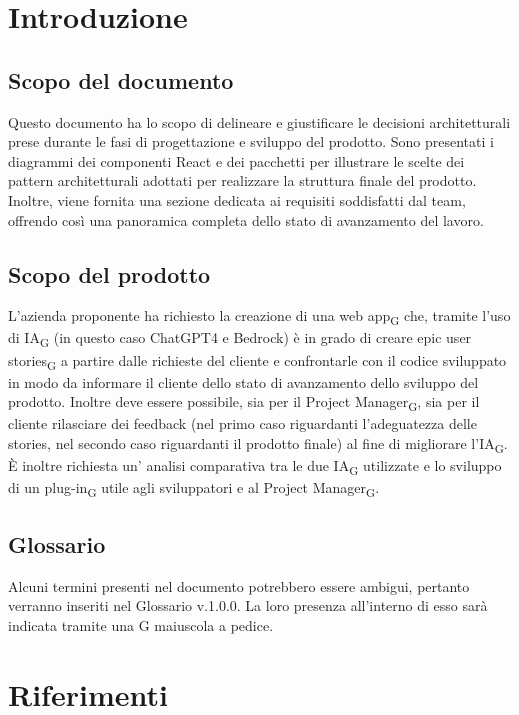 \documentclass{article}
\begin{document}
{\section{Introduzione}
\subsection{Scopo del documento}
Questo documento ha lo scopo di delineare e giustificare le decisioni architetturali prese durante le fasi di progettazione e sviluppo del prodotto. Sono presentati i diagrammi dei componenti React e dei pacchetti per illustrare le scelte dei pattern architetturali adottati per realizzare la struttura finale del prodotto. Inoltre, viene fornita una sezione dedicata ai requisiti soddisfatti dal team, offrendo così una panoramica completa dello stato di avanzamento del lavoro.
\subsection{Scopo del prodotto}
L'azienda proponente ha richiesto la creazione di una web app\textsubscript{G} che, tramite l'uso di IA\textsubscript{G} (in questo caso ChatGPT4 e Bedrock) è in grado di creare epic user stories\textsubscript{G} a partire dalle richieste del cliente e confrontarle con il codice sviluppato in modo da informare il cliente dello stato di avanzamento dello sviluppo del prodotto. Inoltre deve essere possibile, sia per il Project Manager\textsubscript{G}, sia per il cliente rilasciare dei feedback (nel primo caso riguardanti l'adeguatezza delle stories, nel secondo caso riguardanti il prodotto finale) al fine di migliorare l'IA\textsubscript{G}. È inoltre richiesta un' analisi comparativa tra le due IA\textsubscript{G} utilizzate e lo sviluppo di un plug-in\textsubscript{G} utile agli sviluppatori e al Project Manager\textsubscript{G}.

\subsection{Glossario}
Alcuni termini presenti nel documento potrebbero essere ambigui, pertanto verranno inseriti nel Glossario v.1.0.0. La loro presenza all'interno di esso sarà indicata tramite una G maiuscola a pedice.

\section{Riferimenti}
}
\end{document}
